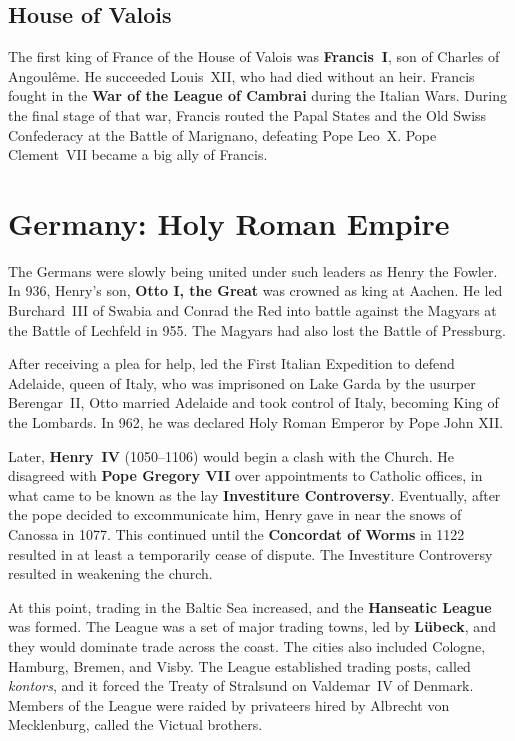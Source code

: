 \subsection*{House of Valois}

The first king of France of the House of Valois was \textbf{Francis~I}, son of Charles of Angoul\^eme.
He succeeded Louis~XII, who had died without an heir.
Francis fought in the \textbf{War of the League of Cambrai} during the Italian Wars.
During the final stage of that war, Francis routed the Papal States and the Old Swiss Confederacy
at the Battle of Marignano, defeating Pope Leo~X.
Pope Clement~VII became a big ally of Francis.

\section{Germany: Holy Roman Empire}

The Germans were slowly being united under such leaders as Henry the Fowler.
In 936, Henry's son, \textbf{Otto I, the Great} was crowned as king at Aachen.
He led Burchard~III of Swabia and Conrad the Red into battle
against the Magyars at the Battle of Lechfeld in 955.
The Magyars had also lost the Battle of Pressburg.

After receiving a plea for help, led the First Italian Expedition to defend Adelaide, queen of Italy,
who was imprisoned on Lake Garda by the usurper Berengar~II,
Otto married Adelaide and took control of Italy, becoming King of the Lombards.
In 962, he was declared Holy Roman Emperor by Pope John XII\@.

Later, \textbf{Henry~IV} (1050--1106) would begin a clash with the Church.
He disagreed with \textbf{Pope Gregory VII} over appointments to Catholic offices,
in what came to be known as the lay \textbf{Investiture Controversy}.
Eventually, after the pope decided to excommunicate him, Henry gave in near the snows of Canossa in 1077.
This continued until the \textbf{Concordat of Worms} in 1122 resulted in at least a temporarily cease of dispute.
The Investiture Controversy resulted in weakening the church.

At this point, trading in the Baltic Sea increased, and the \textbf{Hanseatic League} was formed.
The League was a set of major trading towns, led by \textbf{L\"ubeck}, and they would dominate trade across the coast.
The cities also included Cologne, Hamburg, Bremen, and Visby.
The League established trading posts, called \textit{kontors},
and it forced the Treaty of Stralsund on Valdemar~IV of Denmark.
Members of the League were raided by privateers hired by Albrecht von Mecklenburg, called the Victual brothers.

